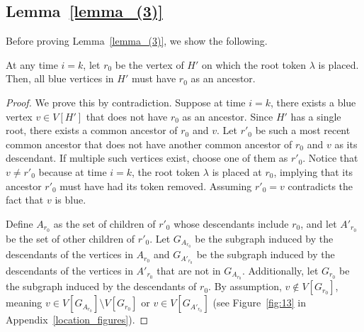 \documentclass[runningheads]{llncs}
\theoremstyle{plain}
\theoremstyle{definition}
\begin{document}
\subsection{\textbf{Lemma~\ref{lemma_(3)}}}\label{appendix_D7}

Before proving Lemma~\ref{lemma_(3)}, we show the following.  

\begin{lemma}\label{blue_reachable}
    At any time $i = k$, let $r_0$ be the vertex of $H'$ on which the root token $\lambda$ is placed. Then, all blue vertices in $H'$ must have $r_0$ as an ancestor.
\end{lemma}

\begin{proof}
    We prove this by contradiction. Suppose at time $i = k$, there exists a blue vertex $v \in V[H']$ that does not have $r_0$ as an ancestor. Since $H'$ has a single root, there exists a common ancestor of $r_0$ and $v$. Let $r'_0$ be such a most recent common ancestor that does not have another common ancestor of $r_0$ and $v$ as its descendant. If multiple such vertices exist, choose one of them as $r'_0$. Notice that $v \neq r'_0$ because at time $i = k$, the root token $\lambda$ is placed at $r_0$, implying that its ancestor $r'_0$ must have had its token removed. Assuming $r'_0 = v$ contradicts the fact that $v$ is blue.
    
    Define $A_{r_0}$ as the set of children of $r'_0$ whose descendants include $r_0$, and let $A'_{r_0}$ be the set of other children of $r'_0$. Let $G_{A_{r_0}}$ be the subgraph induced by the descendants of the vertices in $A_{r_0}$ and $G_{A'_{r_0}}$ be the subgraph induced by the descendants of the vertices in $A'_{r_0}$ that are not in $G_{A_{r_0}}$. Additionally, let $G_{r_0}$ be the subgraph induced by the descendants of $r_0$. By assumption, $v \notin V[G_{r_0}]$, meaning $v \in V[G_{A_{r_0}}] \setminus V[G_{r_0}]$ or $v \in V[G_{A'_{r_0}}]$ (see Figure~\ref{fig:13} in Appendix~\ref{location_figures}).
    

\end{proof}
\end{document}
